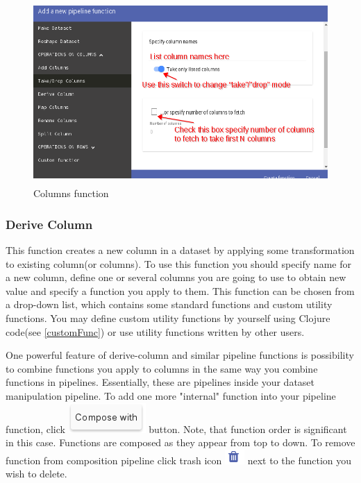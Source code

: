 \documentclass[USenglish]{article}
\begin{document}
 \begin{center}
\begin{figure}[!htbp]
\centering
\includegraphics[height=7cm] {columns1.png}
 \caption{Columns function \label{meta}}
\end{figure}
\end{center}

\subsubsection{Derive Column}
This function creates a new column in a dataset by applying some transformation to existing column(or columns). To use this function you should specify name for a new column, define one or several columns you are going to use to obtain new value and specify a function you apply to them. This function can be chosen from a drop-down list, which contains some standard functions and custom utility functions. You may define custom utility functions by yourself using Clojure code(see \ref{customFunc}) or use utility functions written by other users.
\begin{mdframed}[hidealllines=true,backgroundcolor=gray!15]
One powerful feature of derive-column and similar pipeline functions is possibility to combine functions you apply to columns in the same way you combine functions in pipelines. Essentially, these are pipelines inside your dataset manipulation pipeline. To add one more "internal" function into your pipeline function, click {\includegraphics[scale=0.5]{compose.png}} button. Note, that function order is significant in this case. Functions are composed as they appear from top to down. To remove function from composition pipeline click trash icon {\includegraphics[scale=0.8]{trash.png}} next to the function you wish to delete.
\end{mdframed}
\end{document}
